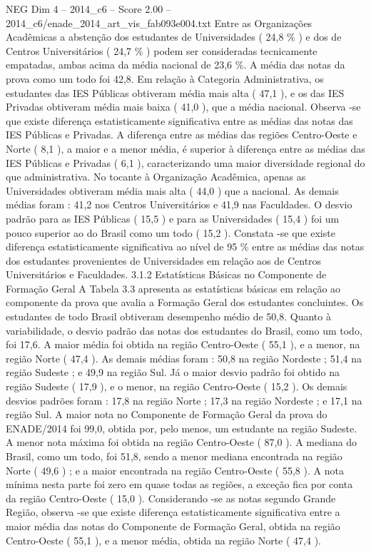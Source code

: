 \begin{textsample}{NEG Dim 4 – 2014\_c6 – Score 2.00 – 2014\_c6/enade\_2014\_art\_vis\_fab093e004.txt}
Entre as Organizações Acadêmicas a abstenção dos estudantes de Universidades ( 24,8 \% ) e dos de Centros Universitários ( 24,7 \% ) podem ser consideradas tecnicamente empatadas, ambas acima da média nacional de 23,6 \%.
A média das notas da prova como um todo foi 42,8.
Em relação à Categoria Administrativa, os estudantes das IES Públicas obtiveram média mais alta ( 47,1 ), e os das IES Privadas obtiveram média mais baixa ( 41,0 ), que a média nacional.
Observa -se que existe diferença estatisticamente significativa entre as médias das notas das IES Públicas e Privadas.
A diferença entre as médias das regiões Centro-Oeste e Norte ( 8,1 ), a maior e a menor média, é superior à diferença entre as médias das IES Públicas e Privadas ( 6,1 ), caracterizando uma maior diversidade regional do que administrativa.
No tocante à Organização Acadêmica, apenas as Universidades obtiveram média mais alta ( 44,0 ) que a nacional.
As demais médias foram : 41,2 nos Centros Universitários e 41,9 nas Faculdades.
O desvio padrão para as IES Públicas ( 15,5 ) e para as Universidades ( 15,4 ) foi um pouco superior ao do Brasil como um todo ( 15,2 ).
Constata -se que existe diferença estatisticamente significativa ao nível de 95 \% entre as médias das notas dos estudantes provenientes de Universidades em relação aos de Centros Universitários e Faculdades. 3.1.2 Estatísticas Básicas no Componente de Formação Geral A Tabela 3.3 apresenta as estatísticas básicas em relação ao componente da prova que avalia a Formação Geral dos estudantes concluintes.
Os estudantes de todo Brasil obtiveram desempenho médio de 50,8.
Quanto à variabilidade, o desvio padrão das notas dos estudantes do Brasil, como um todo, foi 17,6.
A maior média foi obtida na região Centro-Oeste ( 55,1 ), e a menor, na região Norte ( 47,4 ).
As demais médias foram : 50,8 na região Nordeste ; 51,4 na região Sudeste ; e 49,9 na região Sul.
Já o maior desvio padrão foi obtido na região Sudeste ( 17,9 ), e o menor, na região Centro-Oeste ( 15,2 ).
Os demais desvios padrões foram : 17,8 na região Norte ; 17,3 na região Nordeste ; e 17,1 na região Sul.
A maior nota no Componente de Formação Geral da prova do ENADE/2014 foi 99,0, obtida por, pelo menos, um estudante na região Sudeste.
A menor nota máxima foi obtida na região Centro-Oeste ( 87,0 ).
A mediana do Brasil, como um todo, foi 51,8, sendo a menor mediana encontrada na região Norte ( 49,6 ) ; e a maior encontrada na região Centro-Oeste ( 55,8 ).
A nota mínima nesta parte foi zero em quase todas as regiões, a exceção fica por conta da região Centro-Oeste ( 15,0 ).
Considerando -se as notas segundo Grande Região, observa -se que existe diferença estatisticamente significativa entre a maior média das notas do Componente de Formação Geral, obtida na região Centro-Oeste ( 55,1 ), e a menor média, obtida na região Norte ( 47,4 ).

\end{textsample}
